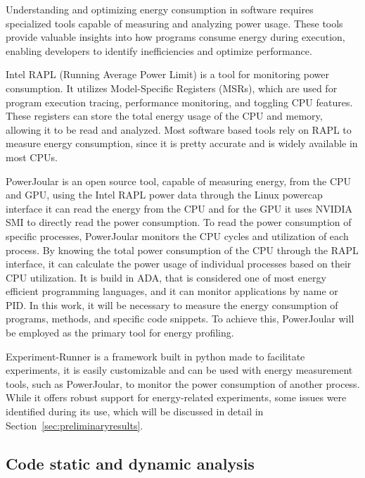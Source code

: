 \documentclass[sigplan]{acmart}
\begin{document}
Understanding and optimizing energy consumption in software requires specialized tools capable of measuring and analyzing power usage. These tools provide valuable insights into how programs consume energy during execution, enabling developers to identify inefficiencies and optimize performance.

Intel RAPL (Running Average Power Limit)\cite{intel_rapl} is a tool for monitoring power consumption. It utilizes Model-Specific Registers (MSRs), which are used for program execution tracing, performance monitoring, and toggling CPU features. These registers can store the total energy usage of the CPU and memory, allowing it to be read and analyzed. Most software based tools rely on RAPL to measure energy consumption, since it is pretty accurate and is widely available in most CPUs.

PowerJoular \cite{noureddine-ie-2022} is an open source tool, capable of measuring energy, from the CPU and GPU, using the Intel RAPL power data through the Linux powercap interface it can read the energy from the CPU and for the GPU it uses NVIDIA SMI to directly read the power consumption.
To read the power consumption of specific processes, PowerJoular monitors the CPU cycles and utilization of each process. By knowing the total power consumption of the CPU through the RAPL interface, it can calculate the power usage of individual processes based on their CPU utilization.
It is build in ADA, that is considered one of most energy efficient programming languages\cite{PEREIRA2021102609}, and it can monitor applications by name or PID. In this work, it will be necessary to measure the energy consumption of programs, methods, and specific code snippets. To achieve this, PowerJoular will be employed as the primary tool for energy profiling.

Experiment-Runner\cite{S2_Group_Experiment_Runner} is a framework built in python made to facilitate experiments, it is easily customizable and can be used with energy measurement tools, such as PowerJoular, to monitor the power consumption of another process. While it offers robust support for energy-related experiments, some issues were identified during its use, which will be discussed in detail in Section~\ref{sec:preliminaryresults}.


\subsection{Code static and dynamic analysis} \label{sec:background_static_dynamic_analysis}
\end{document}
